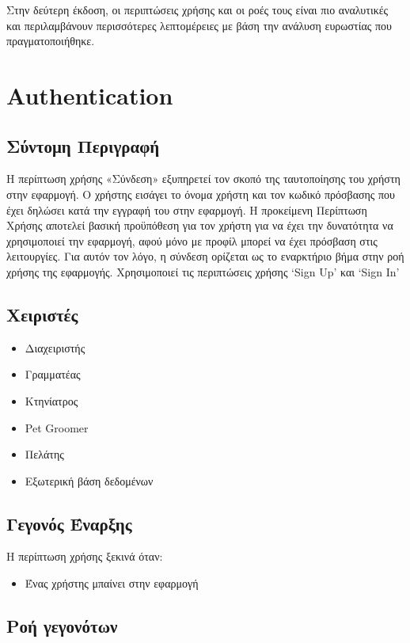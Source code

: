 \documentclass[12pt,a4paper,twoside]{book}
\begin{document}
Στην δεύτερη έκδοση, οι περιπτώσεις χρήσης και οι ροές τους είναι πιο αναλυτικές και περιλαμβάνουν περισσότερες λεπτομέρειες με βάση την ανάλυση ευρωστίας που πραγματοποιήθηκε. %

\section{Authentication}

\subsection{Σύντομη Περιγραφή}
Η περίπτωση χρήσης «Σύνδεση» εξυπηρετεί τον σκοπό της ταυτοποίησης του χρήστη στην εφαρμογή. Ο χρήστης εισάγει το όνομα χρήστη και τον κωδικό πρόσβασης που έχει δηλώσει κατά την εγγραφή του στην εφαρμογή. Η προκείμενη Περίπτωση Χρήσης αποτελεί βασική προϋπόθεση για τον χρήστη για να έχει την δυνατότητα να χρησιμοποιεί την εφαρμογή, αφού μόνο με προφίλ μπορεί να έχει πρόσβαση στις λειτουργίες. Για αυτόν τον λόγο, η σύνδεση ορίζεται ως το εναρκτήριο βήμα στην ροή χρήσης της εφαρμογής. Χρησιμοποιεί τις περιπτώσεις χρήσης `Sign Up' και `Sign In' %

\subsection{Χειριστές}
\begin{itemize}
  \item Διαχειριστής
  \item Γραμματέας
  \item Κτηνίατρος
  \item Pet Groomer
  \item Πελάτης
  \item Εξωτερική βάση δεδομένων %
\end{itemize}

\subsection{Γεγονός Έναρξης}
Η περίπτωση χρήσης ξεκινά όταν:
\begin{itemize}
  \item Ένας χρήστης μπαίνει στην εφαρμογή
\end{itemize}

\subsection{Ροή γεγονότων}
\end{document}
